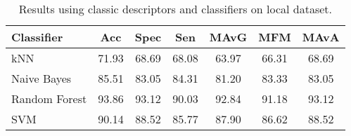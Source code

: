 \documentclass[12pt,italian]{article}
\begin{document}


\begin{table}
	\centering
	\caption{Results using classic descriptors and classifiers on local dataset.}
	\label{tab:classicClassificationCagliari}
	\begin{tabular}{lcccccc}
		\toprule
		Classifier    &  Acc  & Spec  &  Sen  & MAvG  &  MFM  & MAvA  \\ \midrule
		kNN           & 71.93 & 68.69 & 68.08 & 63.97 & 66.31 & 68.69 \\
		Naive Bayes   & 85.51 & 83.05 & 84.31 & 81.20 & 83.33 & 83.05 \\
		Random Forest & 93.86 & 93.12 & 90.03 & 92.84 & 91.18 & 93.12 \\
		SVM           & 90.14 & 88.52 & 85.77 & 87.90 & 86.62 & 88.52 \\ \bottomrule
	\end{tabular}
\end{table}

\pagebreak 
\end{document}
